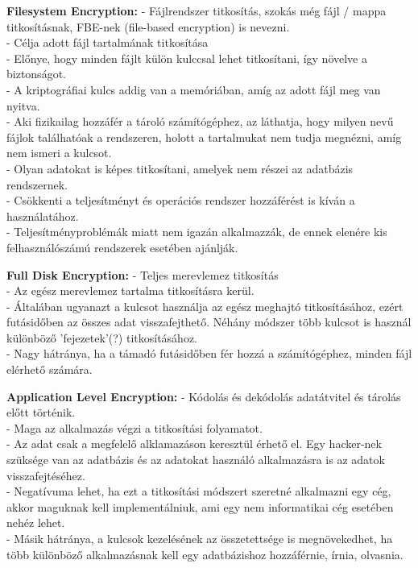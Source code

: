 \vspace{25pt}
\noindent\textbf{Filesystem Encryption:} \newline
\noindent- Fájlrendszer titkosítás, szokás még fájl / mappa titkosításnak, FBE-nek (file-based encryption) is nevezni.
\\- Célja adott fájl tartalmának titkosítása
\\- Előnye, hogy minden fájlt külön kulccsal lehet titkosítani, így növelve a biztonságot.
\\- A kriptográfiai kulcs addig van a memóriában, amíg az adott fájl meg van nyitva.
\\- Aki fizikailag hozzáfér a tároló számítógéphez, az láthatja, hogy milyen nevű fájlok találhatóak a rendszeren, holott a tartalmukat nem tudja megnézni, amíg nem ismeri a kulcsot.
\\- Olyan adatokat is képes titkosítani, amelyek nem részei az adatbázis rendszernek.
\\- Csökkenti a teljesítményt és operációs rendszer hozzáférést is kíván a használatához.
\\- Teljesítményproblémák miatt nem igazán alkalmazzák, de ennek elenére kis felhasználószámú rendszerek esetében ajánlják.


\vspace{25pt}
\noindent\textbf{Full Disk Encryption:} \newline
\noindent- Teljes merevlemez titkosítás
\\- Az egész merevlemez tartalma titkosításra kerül. 
\\- Általában ugyanazt a kulcsot használja az egész meghajtó titkosításához, ezért futásidőben az összes adat visszafejthető. Néhány módszer több kulcsot is használ különböző ’fejezetek’(?) titkosításához.
\\- Nagy hátránya, ha a támadó futásidőben fér hozzá a számítógéphez, minden fájl elérhető számára. 

\vspace{25pt}
\noindent\textbf{Application Level Encryption:} \newline
\noindent- Kódolás és dekódolás adatátvitel és tárolás előtt történik.
\\- Maga az alkalmazás végzi a titkosítási folyamatot.
\\- Az adat csak a megfelelő alklamazáson keresztül érhető el. Egy hacker-nek szüksége van az adatbázis és az adatokat használó alkalmazásra is az adatok visszafejtéséhez.
\\- Negatívuma lehet, ha ezt a titkosítási módszert szeretné alkalmazni egy cég, akkor maguknak kell implementálniuk, ami egy nem informatikai cég esetében nehéz lehet.
\\- Másik hátránya, a kulcsok kezelésének az összetettsége is megnövekedhet, ha több különböző alkalmazásnak kell egy adatbázishoz hozzáférnie, írnia, olvasnia.



